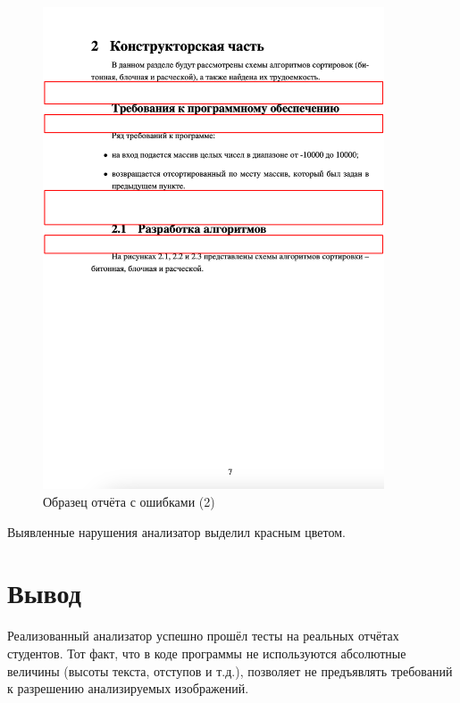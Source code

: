 \begin{figure}
	\centering
	\includegraphics[width=0.9\textwidth]{images/neg2.png}
	\caption{Образец отчёта с ошибками (2)}
	\label{img:neg2}
\end{figure}

Выявленные нарушения анализатор выделил красным цветом.

\section*{Вывод}

Реализованный анализатор успешно прошёл тесты на реальных отчётах студентов. Тот факт, что в коде программы не используются абсолютные величины (высоты текста, отступов и т.д.), позволяет не предъявлять требований к разрешению анализируемых изображений.

\clearpage
